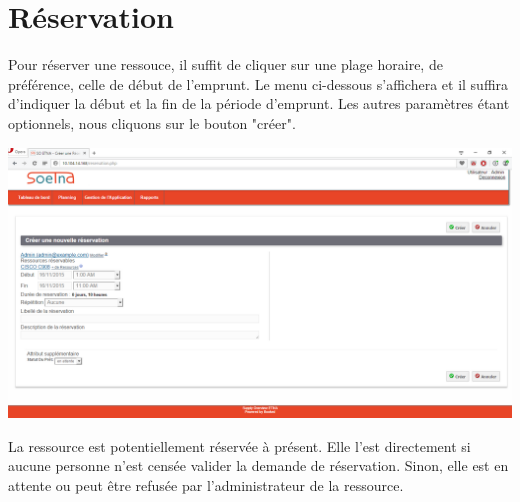 \documentclass[a4paper,11pt]{article}
\begin{document}
\section{Réservation}

Pour réserver une ressouce, il suffit de cliquer sur une plage horaire, de préférence, celle de début de l'emprunt.
Le menu ci-dessous s'affichera et il suffira d'indiquer la début et la fin de 
la période d'emprunt. Les autres paramètres étant optionnels, nous cliquons sur le bouton "créer".

\includegraphics[width=15cm]{./resa2.PNG}

La ressource est potentiellement réservée à présent. Elle l'est directement si aucune personne
n'est censée valider la demande de réservation. Sinon, elle est en attente ou peut être refusée
par l'administrateur de la ressource.
\end{document}
